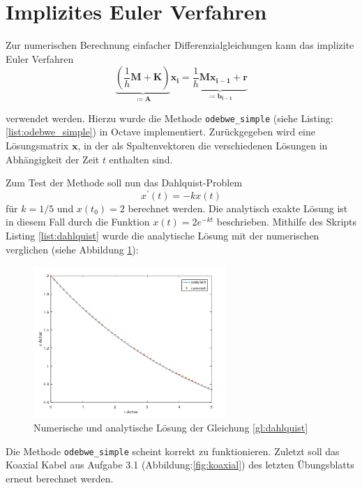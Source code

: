 \section{Implizites Euler Verfahren}\label{sec:ag4_2}

Zur numerischen Berechnung einfacher Differenzialgleichungen kann das implizite Euler Verfahren
\begin{equation}
\underbrace{
	\left( \dfrac{1}{h} \mathbf{M} + \mathbf{K} \right)
}_{\coloneqq \mathbf{A}}
\mathbf{x_i} =
\underbrace{
	\dfrac{1}{h} \mathbf{M} \mathbf{x_{i-1}} + \mathbf{r}
}_{\coloneqq \mathbf{b_{i-1}}}
\end{equation}

verwendet werden. Hierzu wurde die Methode \texttt{odebwe\_simple} (siehe Listing:\ref{list:odebwe_simple}) in Octave implementiert. Zurückgegeben wird eine Lösungsmatrix $\mathbf{x}$, in der als Spaltenvektoren die verschiedenen Lösungen in Abhängigkeit der Zeit $t$ enthalten sind.

Zum Test der Methode soll nun das Dahlquist-Problem 
\begin{equation}
	\label{gl:dahlquist}
	x^{\prime}(t) = -kx(t)
\end{equation}
für $k=1/5$ und $x(t_0) = 2$ berechnet werden. Die analytisch exakte Lösung ist in diesem Fall durch die Funktion $x(t) = 2 e^{-k t}$ beschrieben. Mithilfe des Skripts Listing \ref{list:dahlquist} wurde die analytische Lösung mit der numerischen verglichen (siehe Abbildung \ref{fig:dahlquist}):

\begin{figure}[h]
	\centering
	\includegraphics[width=0.65\textwidth]{data/dahlquist}
	\caption{\centering Numerische und analytische Lösung der Gleichung \ref{gl:dahlquist}}
	\label{fig:dahlquist}
\end{figure}

Die Methode \texttt{odebwe\_simple} scheint korrekt zu funktionieren.
\newpage
Zuletzt soll das Koaxial Kabel aus Aufgabe 3.1 (Abbildung:\ref{fig:koaxial}) des letzten Übungsblatts erneut berechnet werden. 

